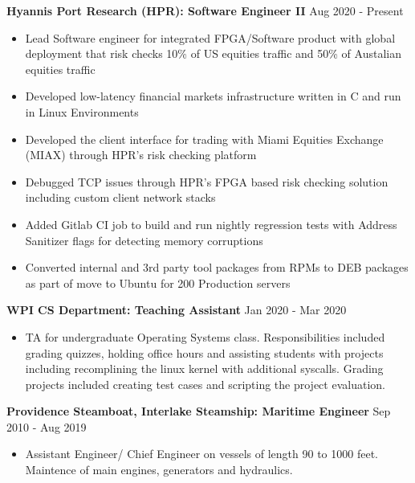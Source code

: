 \documentclass[10pt,a4paper]{article}
\begin{document}
{\begin{tcolorbox}
  \large{\textbf{Hyannis Port Research (HPR): Software Engineer II}}
  \hfill
  \large{Aug 2020 - Present}
  \begin{itemize}[noitemsep]
    \item Lead Software engineer for integrated FPGA/Software product with global deployment that risk checks 10\% of US equities traffic and 50\% of Austalian equities traffic
    \item Developed low-latency financial markets infrastructure written in C and run in Linux Environments
    \item Developed the client interface for trading with Miami Equities Exchange (MIAX) through HPR's risk checking platform
    \item Debugged TCP issues through HPR's FPGA based risk checking solution including custom client network stacks
    \item Added Gitlab CI job to build and run nightly regression tests with Address Sanitizer flags for detecting memory corruptions
    \item Converted internal and 3rd party tool packages from RPMs to DEB packages as part of move to Ubuntu for 200 Production servers
  \end{itemize}

  \large{\textbf{WPI CS Department: Teaching Assistant}}
  \hfill
  \large{Jan 2020 - Mar 2020}
  \begin{itemize}[noitemsep]
    \item TA for undergraduate Operating Systems class. Responsibilities included grading quizzes, holding office hours and assisting students with projects including recomplining the linux kernel with additional syscalls. Grading projects included creating test cases and scripting the project evaluation.
  \end{itemize}

  \large{\textbf{Providence Steamboat, Interlake Steamship: Maritime Engineer}}
  \hfill
  \large{Sep 2010 - Aug 2019}
  \begin{itemize}[noitemsep]
    \item Assistant Engineer/ Chief Engineer on vessels of length 90 to 1000 feet. Maintence of main engines, generators and hydraulics.
  \end{itemize}

\end{tcolorbox}

}
\end{document}

